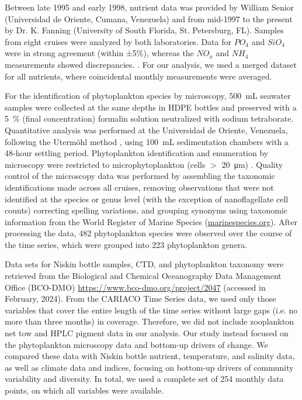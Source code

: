 \documentclass[draft]{agujournal2019}
\begin{document}
    Between late 1995 and early 1998, nutrient data was provided by William Senior (Universidad de Oriente, Cumana, Venezuela) and from mid-1997 to the present by Dr. K. Fanning (University of South Florida, St. Petersburg, FL). Samples from eight cruises were analyzed by both laboratories. Data for $PO_4$ and $SiO_4$ were in strong agreement (within ±5\%), whereas the $NO_x$ and $NH_4$ measurements showed discrepancies. \cite{taylor_ecosystem_2012}. For our analysis, we used a merged dataset for all nutrients, where coincidental monthly measurements were averaged.
       
    For the identification of phytoplankton species by microscopy, \qty{500}{\milli\liter} seawater samples were collected at the same depths in HDPE bottles and preserved with a \qty{5}{\%} (final concentration) formalin solution neutralized with sodium tetraborate. Quantitative analysis was performed at the Universidad de Oriente, Venezuela, following the Utermöhl method \cite{hasle1978inverted}, using \qty{100}{\milli\liter} sedimentation chambers with a 48-hour settling period. Phytoplankton identification and enumeration by microscopy were restricted to microphytoplankton (cells $>$ \qty{20}{\micro \meter}) \cite{mutshinda_environmental_2013}.
    Quality control of the microscopy data was performed by assembling the taxonomic identifications made across all cruises, removing observations that were not identified at the species or genus level (with the exception of nanoflagellate cell counts) correcting spelling variations, and grouping synonyms using taxonomic information from the World Register of Marine Species (\url{marinespecies.org}). After processing the data, 482 phytoplankton species were observed over the course of the time series, which were grouped into 223 phytoplankton genera.

    
    Data sets for Niskin bottle samples, CTD, and phytoplankton taxonomy were retrieved from the Biological and Chemical Oceanography Data Management Office (BCO-DMO) \url{https://www.bco-dmo.org/project/2047} (accessed in February, 2024). 
    From the CARIACO Time Series data, we used only those variables that cover the entire length of the time series without large gaps (i.e. no more than three months) in coverage. Therefore, we did not include zooplankton net tow and HPLC pigment data in our analysis. Our study instead focused on the phytoplankton microscopy data and bottom-up drivers of change. We compared these data with Niskin bottle nutrient, temperature, and salinity data, as well as climate data and indices, focusing on bottom-up drivers of community variability and diversity. In total, we used a complete set of 254 monthly data points, on which all variables were available.
\end{document}
